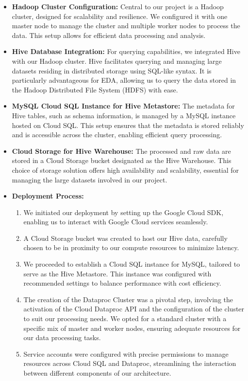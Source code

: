 \documentclass{article}
\begin{document}
\begin{itemize}
    \item \textbf{Hadoop Cluster Configuration:} Central to our project is a Hadoop cluster, designed for scalability and resilience. We configured it with one master node to manage the cluster and multiple worker nodes to process the data. This setup allows for efficient data processing and analysis.
    
    \item \textbf{Hive Database Integration:} For querying capabilities, we integrated Hive with our Hadoop cluster. Hive facilitates querying and managing large datasets residing in distributed storage using SQL-like syntax. It is particularly advantageous for EDA, allowing us to query the data stored in the Hadoop Distributed File System (HDFS) with ease.
    
    \item \textbf{MySQL Cloud SQL Instance for Hive Metastore:} The metadata for Hive tables, such as schema information, is managed by a MySQL instance hosted on Cloud SQL. This setup ensures that the metadata is stored reliably and is accessible across the cluster, enabling efficient query processing.
    
    \item \textbf{Cloud Storage for Hive Warehouse:} The processed and raw data are stored in a Cloud Storage bucket designated as the Hive Warehouse. This choice of storage solution offers high availability and scalability, essential for managing the large datasets involved in our project.
    
    \item \textbf{Deployment Process:}
        \begin{enumerate}
            \item We initiated our deployment by setting up the Google Cloud SDK, enabling us to interact with Google Cloud services seamlessly.
            \item A Cloud Storage bucket was created to host our Hive data, carefully chosen to be in proximity to our compute resources to minimize latency.
            \item We proceeded to establish a Cloud SQL instance for MySQL, tailored to serve as the Hive Metastore. This instance was configured with recommended settings to balance performance with cost efficiency.
            \item The creation of the Dataproc Cluster was a pivotal step, involving the activation of the Cloud Dataproc API and the configuration of the cluster to suit our processing needs. We opted for a standard cluster with a specific mix of master and worker nodes, ensuring adequate resources for our data processing tasks.
            \item Service accounts were configured with precise permissions to manage resources across Cloud SQL and Dataproc, streamlining the interaction between different components of our architecture.
        \end{enumerate}
\end{itemize}
\end{document}
